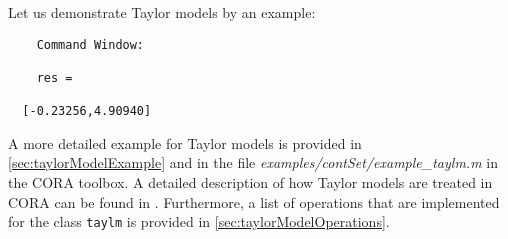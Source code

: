\newpage
Let us demonstrate Taylor models by an example:

\begin{center}
\begin{minipage}[t]{0.50\textwidth}
	\vspace{10pt}
	\footnotesize
	
\end{minipage}
\begin{minipage}[t]{0.25\textwidth}
	\vspace{10pt}

	\begin{verbatim}	
	Command Window:
	
	res =

  [-0.23256,4.90940]
	\end{verbatim}
\end{minipage}
\end{center}

A more detailed example for Taylor models is provided in \cref{sec:taylorModelExample} and in the file \textit{examples/contSet/example\_taylm.m} in the CORA toolbox. A detailed description of how Taylor models are treated in CORA can be found in \cite{Althoff2018b}. Furthermore, a list of operations that are implemented for the class \texttt{taylm} is provided in \cref{sec:taylorModelOperations}.